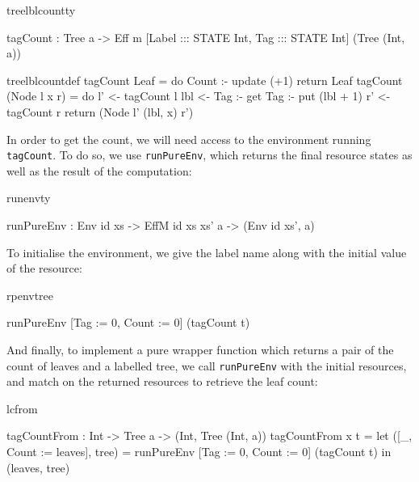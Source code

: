 \begin{SaveVerbatim}{treelblcountty}

tagCount : Tree a -> Eff m [Label ::: STATE Int, 
                            Tag   ::: STATE Int] 
                              (Tree (Int, a))
\end{SaveVerbatim}
\begin{SaveVerbatim}{treelblcountdef}
tagCount Leaf
     = do Count :- update (+1)
          return Leaf
tagCount (Node l x r) 
     = do l' <- tagCount l
          lbl <- Tag :- get
          Tag :- put (lbl + 1)
          r' <- tagCount r
          return (Node l' (lbl, x) r')

\end{SaveVerbatim}



\noindent
In order to get the count, we will need access to the environment 
running \texttt{tagCount}. To do so, we use \texttt{runPureEnv}, which returns
the final resource states as well as the result of the computation:

\begin{SaveVerbatim}{runenvty}

runPureEnv : Env id xs -> 
             EffM id xs xs' a -> (Env id xs', a)

\end{SaveVerbatim}

\noindent
To initialise the environment, we give the label name along with the initial
value of the resource:

\begin{SaveVerbatim}{rpenvtree}

runPureEnv [Tag := 0, Count := 0] (tagCount t) 

\end{SaveVerbatim}

\noindent
And finally, to implement a pure wrapper function which returns a pair of the
count of leaves and a labelled tree, we call \texttt{runPureEnv} with the
initial resources, and match on the returned resources to retrieve the leaf
count:

\begin{SaveVerbatim}{lcfrom}

tagCountFrom : Int -> Tree a -> (Int, Tree (Int, a))
tagCountFrom x t 
    = let ([_, Count := leaves], tree) =
       runPureEnv [Tag := 0, Count := 0] (tagCount t)
          in (leaves, tree)

\end{SaveVerbatim}

